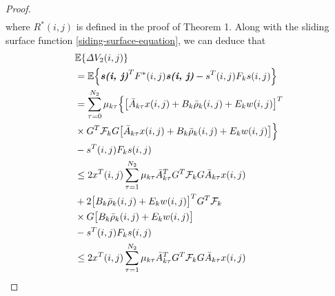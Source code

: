 \documentclass[journal,final,twocolumn]{IEEEtran}
\begin{document}
\begin{proof}
\begin{equation}
\begin{split}
		\end{split}
	\end{equation}
	where $R^{*}(i,j)$ is defined in the proof of Theorem 1.  
	Along with the sliding surface function \eqref{siding-surface-equation}, we can deduce that
	\begin{equation} \label{P2T2}
		\begin{split}
			&\mathbb{E}\{\varDelta V_{2}(i,j) \}\\
			&=\mathbb{E}\Big\{\emph{\textbf{s(i, j)}}^{T}F^{*}(i,j)\emph{\textbf{s(i, j)}} - s^{T}(i,j)F_{k}s(i,j)\Big\}\\
			&=  \sum_{\tau =0}^{N_{2}}\mu_{k\tau }\Big\{\big[\bar{A}_{k\tau }x(i,j)+B_{k}\bar{\rho}_{k}(i,j)+E_{k}w(i,j)\big]^{T}\\
			&\times G^{T}\mathcal{F}_{k} G\big[ \bar{A}_{k\tau }x(i,j)+B_{k}\bar{\rho}_{k}(i,j)+E_{k}w(i,j)\big]\Big\}\\
			&-s^{T}(i,j)F_{k}s(i,j)\\
			&\leq 2x^{T}(i,j)\sum_{\tau =1}^{N_{2}}\mu_{k\tau }\bar{A}^{T}_{k\tau }G^{T}\mathcal{F}_{k}G\bar{A}_{k\tau }x(i,j) \\
			&+2\big[B_{k}\bar{\rho}_{k}(i,j)+E_{k}w(i,j)\big]^{T}G^{T}\mathcal{F}_{k}\\
			&\times G\big[B_{k}\bar{\rho}_{k}(i,j)+E_{k}w(i,j)\big]\\
			&-s^{T}(i,j)F_{k}s(i,j)\\
			&\leq 2x^{T}(i,j)\sum_{\tau =1}^{N_{2}}\mu_{k\tau }\bar{A}^{T}_{k\tau }G^{T}\mathcal{F}_{k}G\bar{A}_{k\tau }x(i,j) \\

\end{split}
\end{equation}
\end{proof}
\end{document}
